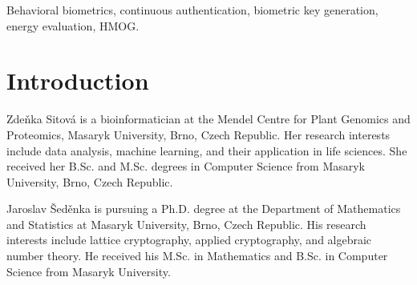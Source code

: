 \documentclass[journal]{IEEEtran}
\begin{document}


\begin{keywords}
Behavioral biometrics, continuous authentication, biometric key generation, energy evaluation, HMOG.
\end{keywords}


\IEEEpeerreviewmaketitle



\section{Introduction}










{\footnotesize
  
 
}





%



\begin{IEEEbiography}{Zde\v nka Sitov\'a} is a bioinformatician at the Mendel Centre for Plant Genomics and Proteomics, Masaryk University, Brno, Czech Republic.
Her research interests include data analysis, machine learning, and their application in life sciences.
She received her B.Sc. and M.Sc. degrees in Computer Science from Masaryk University, Brno, Czech Republic.
\end{IEEEbiography}


\begin{IEEEbiography}{Jaroslav \v Sed\v enka} is pursuing a Ph.D. degree at the Department
of Mathematics and Statistics at Masaryk University, Brno, Czech
Republic. His research interests include lattice cryptography, applied
cryptography, and algebraic number theory.
He received his M.Sc. in Mathematics and B.Sc. in Computer Science
from Masaryk University.

\end{IEEEbiography}
\end{document}
